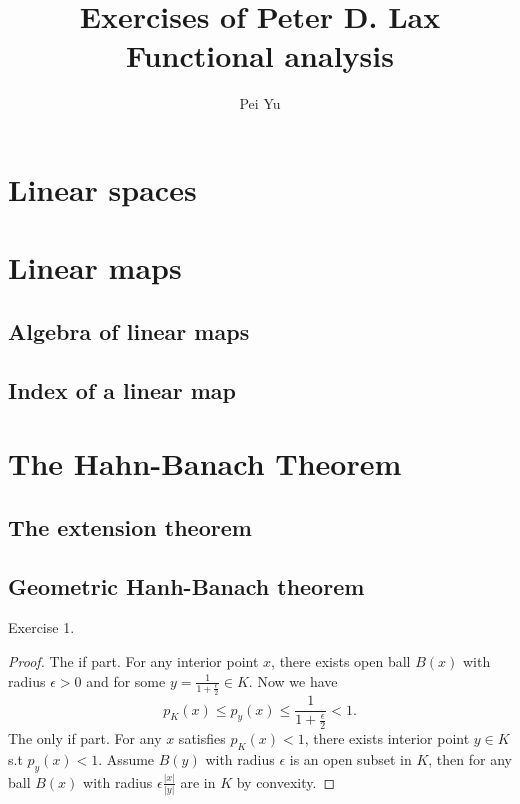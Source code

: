 \documentclass[11pt]{elegantbook}
\title{Exercises of Peter D. Lax Functional analysis}
\author{Pei Yu}
\begin{document}
\maketitle

\frontmatter
\tableofcontents

\mainmatter

\chapter{Linear spaces}


\chapter{Linear maps}

\section{Algebra of linear maps}

\section{Index of a linear map}

\chapter{The Hahn-Banach Theorem}

\section{The extension theorem}

\section{Geometric Hanh-Banach theorem}

Exercise 1.

\begin{proof}
  The if part. For any interior point $x$, there exists open ball $B(x)$ with radius $\epsilon>0$ and for some $y=\frac{1}{1+\frac{\epsilon}{2}}\in K$. Now we have
  \begin{equation*}
    p_K(x)\leqslant p_y(x)\leqslant \frac{1}{1+\frac{\epsilon}{2}} <1.
  \end{equation*}
  The only if part. For any $x$ satisfies $p_K(x)<1$, there exists interior point $y\in K$ s.t $p_y(x)<1$. Assume $B(y)$ with radius $\epsilon$ is an open subset in $K$, then for any ball $B(x)$ with radius $\epsilon\frac{|x|}{|y|}$ are in $K$ by convexity. 
\end{proof}
\end{document}
